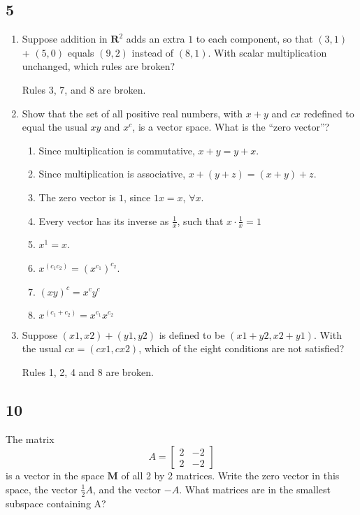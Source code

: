 \documentclass[12pt,letterpaper]{article}
\begin{document}
    \subsection*{5}
      \begin{enumerate}
        \item
          Suppose addition in $\mathbf{R}^2$
          adds an extra $1$ to each component,
          so that $(3, 1)$ + $(5, 0)$ equals $(9, 2)$ instead of $(8, 1)$.
          With scalar multiplication unchanged,
          which rules are broken?

          Rules 3, 7, and 8 are broken.

        \item
          Show that the set of all positive real numbers,
          with $x+y$ and $cx$ redeﬁned to equal the usual $xy$ and $x^c$,
          is a vector space.
          What is the ``zero vector''?

          \begin{enumerate}
            \item Since multiplication is commutative, $x + y = y + x$.
            \item Since multiplication is associative, $x + (y + z) = (x + y) + z$.
            \item The zero vector is $1$, since $1x = x$, $\forall x$.
            \item Every vector has its inverse as $\frac{1}{x}$, such that $x \cdot \frac{1}{x} = 1$
            \item $x^1 = x$.
            \item $x^{(c_1c_2)} = (x^{c_1})^{c_2}$.
            \item $(xy)^c = x^cy^c$
            \item $x^{(c_1+c_2)} = x^{c_1}x^{c_2}$
          \end{enumerate}

        \item
          Suppose $(x1, x2) + (y1, y2)$ is defined to be $(x1 + y2, x2 + y1)$.
          With the usual $cx = (cx1, cx2)$,
          which of the eight conditions are not satisﬁed?

          Rules 1, 2, 4 and 8 are broken.
      \end{enumerate}
    \subsection*{10}
      The matrix
      \[
        A = \left[
        \begin{array}{cc}
          2 & -2 \\
          2 & -2
        \end{array}
        \right]
      \]
      is a vector in the space $\mathbf{M}$ of all 2 by 2 matrices.
      Write the zero vector in this space,
      the vector $\frac{1}{2}A$,
      and the vector $-A$.
      What matrices are in the smallest subspace containing A?
\end{document}

